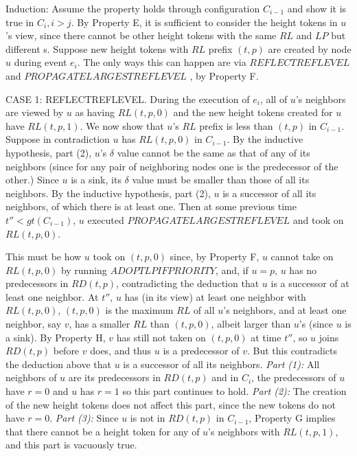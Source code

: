\documentclass{article}
\begin{document}
Induction: Assume the property holds through configuration $C_{i − 1}$ and show it is true in $C_i , i > j$.
By Property E, it is sufficient to consider the height tokens in $u$’s view, since there cannot be other height tokens with the same $RL$ and $LP$ but different \delta s. Suppose new height tokens with $RL$ prefix $(t, p)$ are created by node $u$ during event $e_i$. The only ways this can happen are via $REFLECTREFLEVEL$ and $PROPAGATELARGESTREFLEVEL$ , by Property F.

CASE 1: REFLECTREFLEVEL. During the execution of $e_i$, all of $u$’s neighbors are viewed by $u$ as having $RL(t, p, 0)$ and the new height tokens created for $u$ have $RL(t, p, 1)$.
We now show that $u$’s $RL$ prefix is less than $(t, p)$ in $C_{i − 1}$. Suppose in contradiction $u$ has $RL(t, p, 0)$ in $C_{i − 1}$. By the inductive hypothesis, part (2), $u$’s $\delta $ value cannot be the same as that of any of its neighbors (since for any pair of neighboring nodes one is the predecessor of the other.)
Since $u$ is a sink, its $\delta $ value must be smaller than those of all its neighbors. By the inductive hypothesis, part (2), $u$ is a successor of all its neighbors, of which there is at least one.
Then at some previous time $t'' < gt(C_{i − 1})$, $u$ executed $PROPAGATELARGESTREFLEVEL$ and took on $RL(t, p, 0)$.

This must be how $u$ took on $(t, p, 0)$ since, by Property F, $u$ cannot take on $RL(t, p, 0)$ by running $ADOPTLPIFPRIORITY$, and, if $u = p$, $u$ has no predecessors in $RD(t, p)$, contradicting the deduction that $u$ is a successor of at least one neighbor. At $t''$, $u$ has (in its view) at least one neighbor with $RL(t, p, 0)$, $(t, p, 0)$ is the maximum $RL$ of all $u$’s neighbors, and at least one neighbor, say $v$, has a smaller $RL$ than $(t, p, 0)$, albeit larger than $u$’s (since $u$ is a sink). By Property H, $v$ has still not taken on $(t, p, 0)$ at time $t''$, so $u$ joins $RD(t, p)$ before $v$ does, and thus $u$ is a predecessor of $v$. But this contradicts the deduction above that $u$ is a successor of all its neighbors.
\textit{Part (1):} All neighbors of $u$ are its predecessors in $RD(t, p)$ and in $C_i$, the predecessors of $u$ have $r = 0$ and $u$ has $r = 1$ so this part continues to hold.
\textit{Part (2):} The creation of the new height tokens does not affect this part, since the new tokens do not have $r = 0$.
\textit{Part (3):} Since $u$ is not in $RD(t, p)$ in $C_{i − 1}$, Property G implies that there cannot be a height token for any of $u$’s neighbors with $RL(t, p, 1)$, and this part is vacuously true.
\end{document}
